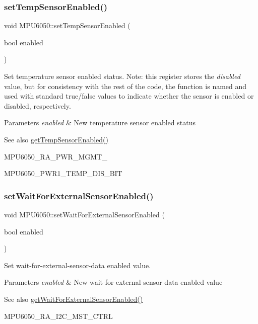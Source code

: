 \subsubsection{\texorpdfstring{setTempSensorEnabled()}{setTempSensorEnabled()}}
{\footnotesize\ttfamily void M\+P\+U6050\+::set\+Temp\+Sensor\+Enabled (\begin{DoxyParamCaption}\item[{bool}]{enabled }\end{DoxyParamCaption})}

Set temperature sensor enabled status. Note\+: this register stores the {\itshape disabled} value, but for consistency with the rest of the code, the function is named and used with standard true/false values to indicate whether the sensor is enabled or disabled, respectively.


\begin{DoxyParams}{Parameters}
{\em enabled} & New temperature sensor enabled status \\
\hline
\end{DoxyParams}
\begin{DoxySeeAlso}{See also}
\mbox{\hyperlink{class_m_p_u6050_a31f588beab6760258212c65725eba336}{get\+Temp\+Sensor\+Enabled()}} 

M\+P\+U6050\+\_\+\+R\+A\+\_\+\+P\+W\+R\+\_\+\+M\+G\+M\+T\+\_ 

M\+P\+U6050\+\_\+\+P\+W\+R1\+\_\+\+T\+E\+M\+P\+\_\+\+D\+I\+S\+\_\+\+B\+IT 
\end{DoxySeeAlso}
\mbox{\label{class_m_p_u6050_a20dc4bdedbe1550580c28a6d090291be}} 
\subsubsection{\texorpdfstring{setWaitForExternalSensorEnabled()}{setWaitForExternalSensorEnabled()}}
{\footnotesize\ttfamily void M\+P\+U6050\+::set\+Wait\+For\+External\+Sensor\+Enabled (\begin{DoxyParamCaption}\item[{bool}]{enabled }\end{DoxyParamCaption})}

Set wait-\/for-\/external-\/sensor-\/data enabled value. 
\begin{DoxyParams}{Parameters}
{\em enabled} & New wait-\/for-\/external-\/sensor-\/data enabled value \\
\hline
\end{DoxyParams}
\begin{DoxySeeAlso}{See also}
\mbox{\hyperlink{class_m_p_u6050_a4e2ebda47b85b4c5463f041c790bf5c0}{get\+Wait\+For\+External\+Sensor\+Enabled()}} 

M\+P\+U6050\+\_\+\+R\+A\+\_\+\+I2\+C\+\_\+\+M\+S\+T\+\_\+\+C\+T\+RL 
\end{DoxySeeAlso}
\mbox{\label{class_m_p_u6050_a340eade71cf6286f6904c2021330944e}} 
